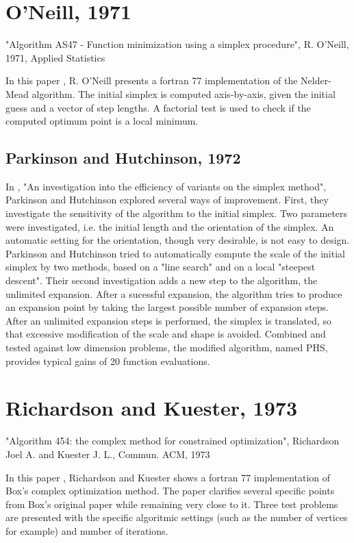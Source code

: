 \section{O'Neill, 1971}

"Algorithm AS47 - Function minimization using a simplex procedure",
R. O'Neill, 1971, Applied Statistics

In this paper \cite{O'Neill1971AAF}, R. O'Neill presents a fortran 77 implementation of the 
Nelder-Mead algorithm. 
The initial simplex is computed axis-by-axis, given the initial guess
and a vector of step lengths.
A factorial test is used to check if the computed optimum point is a local minimum.

\subsection{Parkinson and Hutchinson, 1972}

In \cite{parkinson1972}, "An investigation into the efficiency of variants on the simplex method", 
Parkinson and Hutchinson explored 
several ways of improvement. First, they investigate the sensitivity
of the algorithm to the initial simplex. Two parameters were investigated,
i.e. the initial length and the orientation of the simplex. 
An automatic setting for the orientation, though very desirable, is 
not easy to design. Parkinson and Hutchinson tried to automatically 
compute the scale of the initial simplex by two methods, based on 
a "line search" and on a local "steepest descent".
Their second investigation adds a new step to the algorithm, the unlimited
expansion. After a sucessful expansion, the algorithm tries to produce 
an expansion point by taking the largest possible number of 
expansion steps. After an unlimited expansion steps is performed, the 
simplex is translated, so that excessive modification of the scale and shape 
is avoided. Combined and tested against low dimension problems, the 
modified algorithm, named PHS, provides typical gains of 20%
function evaluations.

\section{Richardson and Kuester, 1973}

"Algorithm 454: the complex method for constrained optimization",
Richardson Joel A. and Kuester J. L.,
Commun. ACM,
1973

In this paper \cite{362324}, Richardson and Kuester shows a fortran 77 implementation
of Box's complex optimization method. The paper clarifies several 
specific points from Box's original paper while remaining very close to it.
Three test problems are presented with the specific algoritmic settings (such as 
the number of vertices for example) and number of iterations.


